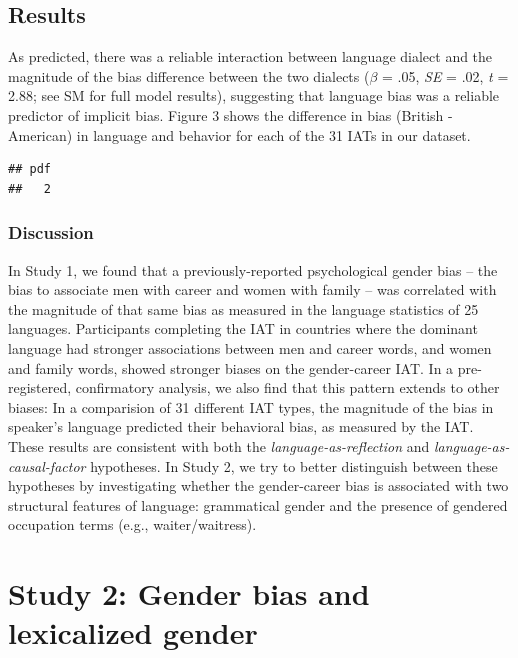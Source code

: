 \documentclass[man,floatsintext]{apa6}
\begin{document}
\hypertarget{results-3}{%
\subsection{Results}\label{results-3}}

As predicted, there was a reliable interaction between language dialect and the magnitude of the bias difference between the two dialects (\(\beta\) = .05, \emph{SE} = .02, \emph{t} = 2.88; see SM for full model results), suggesting that language bias was a reliable predictor of implicit bias. Figure 3 shows the difference in bias (British - American) in language and behavior for each of the 31 IATs in our dataset.

\begin{verbatim}
## pdf 
##   2
\end{verbatim}

\hypertarget{discussion}{%
\subsubsection{Discussion}\label{discussion}}

In Study 1, we found that a previously-reported psychological gender bias -- the bias to associate men with career and women with family -- was correlated with the magnitude of that same bias as measured in the language statistics of 25 languages. Participants completing the IAT in countries where the dominant language had stronger associations between men and career words, and women and family words, showed stronger biases on the gender-career IAT. In a pre-registered, confirmatory analysis, we also find that this pattern extends to other biases: In a comparision of 31 different IAT types, the magnitude of the bias in speaker's language predicted their behavioral bias, as measured by the IAT. These results are consistent with both the \emph{language-as-reflection} and \emph{language-as-causal-factor} hypotheses. In Study 2, we try to better distinguish between these hypotheses by investigating whether the gender-career bias is associated with two structural features of language: grammatical gender and the presence of gendered occupation terms (e.g., waiter/waitress).

\hypertarget{study-2-gender-bias-and-lexicalized-gender}{%
\section{Study 2: Gender bias and lexicalized gender}\label{study-2-gender-bias-and-lexicalized-gender}}
\end{document}
